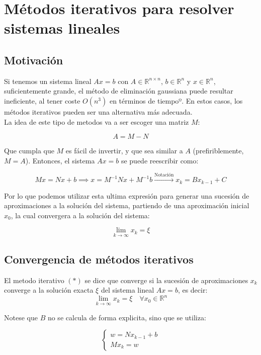 \section{Métodos iterativos para resolver sistemas lineales}
\subsection{Motivación}

Si tenemos un sistema lineal $Ax = b$ con $A \in \mathbb{R}^{n \times n}$, $b \in \mathbb{R}^n$ y $x \in \mathbb{R}^n$, suficientemente grande, el método de eliminación gaussiana puede resultar ineficiente, al tener coste $O(n^3)$ en términos de tiempoº. En estos casos, los métodos iterativos pueden ser una alternativa más adecuada.\\

La idea de este tipo de metodos va a ser escoger una matriz $M$:

\[
    A = M - N
\]

Que cumpla que $M$ es fácil de invertir, y que sea similar a $A$ (prefiriblemente, $M=A$). Entonces, el sistema $Ax = b$ se puede reescribir como:

\[
    Mx = Nx + b \implies
    x = M^{-1}Nx + M^{-1}b \xrightarrow{\text{Notación}}
    x_{k} = Bx_{k-1} + C
\]

Por lo que podemos utilizar esta ultima expresión para generar una sucesión de aproximaciones a la solución del sistema, partiendo de una aproximación inicial $x_0$, la cual convergera a la solución del sistema:

\[
    \lim_{k \to \infty} x_k = \xi
\]

\subsection{Convergencia de métodos iterativos}

\begin{definición}
    El metodo iterativo $(*)$ se dice que converge si la sucesión de aproximaciones $x_k$ converge a la solución exacta $\xi$ del sistema lineal $Ax = b$, es decir:
    \[
        \lim_{k \to \infty} x_k = \xi \quad \forall x_0 \in \mathbb{R}^n
    \]
\end{definición}

Notese que $B$ no se calcula de forma explicita, sino que se utiliza:

\[
    \begin{cases}
        w = Nx_{k-1} + b \\
        Mx_k = w
    \end{cases}
\]

